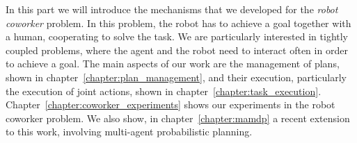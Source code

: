 In this part we will introduce the mechanisms that we developed for the \textit{robot coworker} problem. In this problem, the robot has to achieve a goal together with a human, cooperating to solve the task. We are particularly interested in tightly coupled problems, where the agent and the robot need to interact often in order to achieve a goal.
The main aspects of our work are the management of plans, shown in chapter~\ref{chapter:plan_management}, and their execution, particularly the execution of joint actions, shown in chapter~\ref{chapter:task_execution}. Chapter~\ref{chapter:coworker_experiments} shows our experiments in the robot coworker problem. We also show, in chapter~\ref{chapter:mamdp} a recent extension to this work, involving multi-agent probabilistic planning.

 
 
 
 
